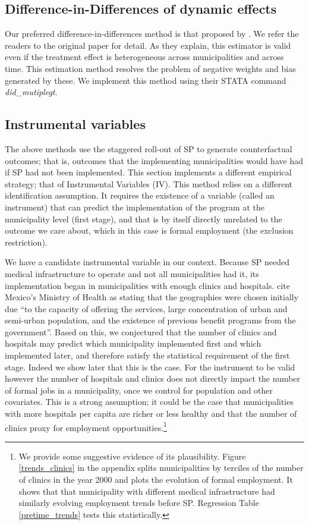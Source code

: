 \documentclass[oneside,11pt]{article}
\begin{document}
\subsection{Difference-in-Differences of dynamic effects}

Our preferred difference-in-differences method is that proposed by \cite{deChaisemartin2020}. We refer the readers to the original paper for detail. As they explain, this estimator is valid even if the treatment effect is heterogeneous across municipalities and across time. This estimation method resolves the problem of negative weights and bias generated by these. We implement this method using their STATA command \textit{did\_mutiplegt}.


\vspace{.1in}
\subsection{Instrumental variables}

The above methods use the staggered roll-out of SP to generate counterfactual outcomes; that is, outcomes that the implementing municipalities would have had if SP had not been implemented. This section implements a different empirical strategy; that of Instrumental Variables (IV). This method relies on a different identification assumption. It requires the existence of a variable (called an instrument) that can predict the implementation of the program at the municipality level (first stage), and that is by itself directly unrelated to the outcome we care about, which in this case is formal employment (the exclusion restriction). 

We have a candidate instrumental variable in our context. Because SP needed medical infrastructure to operate and not all municipalities had it, its implementation began in municipalities with enough clinics and hospitals. \cite{Campos} cite Mexico's Ministry of Health as stating that the geographies were chosen initially due ``to the capacity of offering the services, large concentration of urban and semi-urban population, and the existence of previous benefit programs from the government''. Based on this, we conjectured that the number of clinics and hospitals may predict which municipality implemented first and which implemented later, and therefore satisfy the statistical requirement of the first stage. Indeed we show later that this is the case. For the instrument to be valid however the number of hospitals and clinics does not directly impact the number of formal jobs in a municipality, once we control for population and other covariates. This is a strong assumption; it could be the case that municipalities with more hospitals per capita are richer or less healthy and that the number of clinics proxy for employment opportunities.\footnote{We provide some suggestive evidence of its plausibility. Figure \ref{trends_clinics} in the appendix splits municipalities by terciles of the number of clinics in the year 2000 and plots the evolution of formal employment.  It shows that that municipality with different medical infrastructure had similarly evolving employment trends before SP. Regression Table \ref{pretime_trends} tests this statistically.} 
\end{document}
